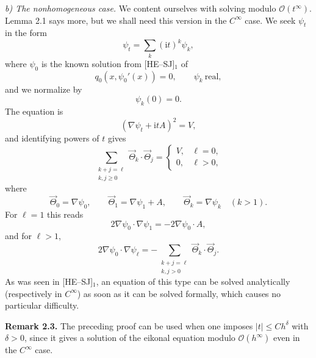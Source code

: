 \documentclass[11pt]{article}
\newcommand{\OO}{\mathcal O}
\newcommand{\ii}{\mathrm{i}}
\begin{document}
\smallskip
\noindent\emph{b) The nonhomogeneous case.}
We content ourselves with solving modulo $\OO(t^\infty)$. Lemma 2.1 says more, but we shall need this version in the $C^\infty$ case.
We seek $\psi_t$ in the form
\begin{equation}
\psi_t=\sum_k(\ii t)^k\psi_k,
\tag{2.26$_1$}
\end{equation}
where $\psi_0$ is the known solution from [HE--SJ]$_1$ of
\begin{equation}
q_0(x,\psi_0'(x))=0,
\qquad \psi_k\ \text{real},
\tag{2.26$_2$}
\end{equation}
and we normalize by
\begin{equation}
\psi_k(0)=0.
\tag{2.26$_3$}
\end{equation}
The equation is
\begin{equation}
(\nabla\psi_t+\ii tA)^2=V,
\tag{2.26$_4$}
\end{equation}
and identifying powers of $t$ gives
\begin{equation}
\sum_{\substack{k+j=\ell\\k,j\ge0}}\vec\Theta_k\cdot\vec\Theta_j
=
\begin{cases}
V,&\ell=0,\\
0,&\ell>0,
\end{cases}
\tag{2.27$_\ell$}
\end{equation}
where
\[
\vec\Theta_0=\nabla\psi_0,\qquad
\vec\Theta_1=\nabla\psi_1+A,\qquad
\vec\Theta_k=\nabla\psi_k\quad(k>1).
\]
For $\ell=1$ this reads
\[
2\nabla\psi_0\cdot\nabla\psi_1=-2\nabla\psi_0\cdot A,
\]
and for $\ell>1$,
\[
2\nabla\psi_0\cdot\nabla\psi_\ell
=-\sum_{\substack{k+j=\ell\\k,j>0}}\vec\Theta_k\cdot\vec\Theta_j.
\]
As was seen in [HE--SJ]$_1$, an equation of this type can be solved analytically (respectively in $C^\infty$) as soon as it can be solved formally, which causes no particular difficulty.

\medskip
\noindent\textbf{Remark 2.3.}
The preceding proof can be used when one imposes $|t|\le Ch^\delta$ with $\delta>0$, since it gives a solution of the eikonal equation modulo $\OO(h^\infty)$ even in the $C^\infty$ case.
\end{document}

